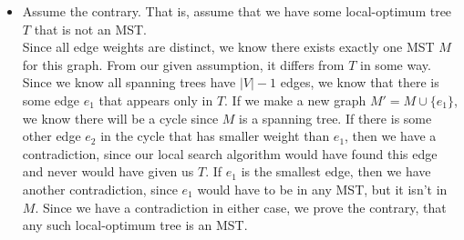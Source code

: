 \documentclass[11pt]{article}
\begin{document}
\begin{solution}
    \begin{itemize}
        \item Assume the contrary. That is, assume that we have some local-optimum tree $T$ that is not an MST. 
            \\ Since all edge weights are distinct, we know there exists exactly one MST $M$ for this graph. 
            From our given assumption, it differs from $T$ in some way. Since we know all spanning trees have $|V| - 1$ edges, 
            we know that there is some edge $e_1$ that appears only in $T$. If we make a new graph $M' = M \cup \{e_1\}$, we know there
            will be a cycle since $M$ is a spanning tree. If there is some other edge $e_2$ in the cycle that has smaller weight 
            than $e_1$, then we have a contradiction, since our local search algorithm would have found this edge and never would have
            given us $T$. If $e_1$ is the smallest edge, then we have another contradiction, since $e_1$ would have to be in any MST, 
            but it isn't in $M$. Since we have a contradiction in either case, we prove the contrary, that any such local-optimum tree is an MST.
    \end{itemize}
\end{solution}

\end{document}
